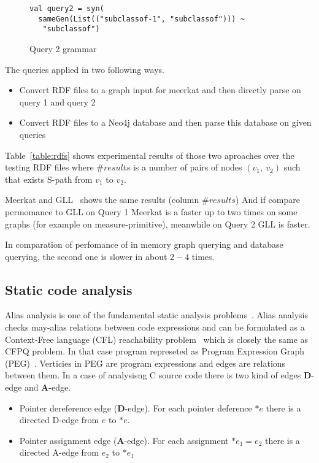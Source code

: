 \begin{figure}[h]
\begin{lstlisting}
val query2 = syn(
  sameGen(List(("subclassof-1", "subclassof"))) ~
   "subclassof")
\end{lstlisting}
\caption{Query 2 grammar}
\label{fig:query2Gen}
\end{figure}

The queries applied in two following ways.
\begin{itemize}
    \item Convert RDF files to a graph input for meerkat and then directly parse on query 1 and query 2
    \item Convert RDF files to a Neo4j database and then parse this database on given queries
\end{itemize} 

Table~\ref{table:rdfs} shows experimental results of those two aproaches over the testing RDF files where $\#results$ is a number of pairs of nodes $(v_1,\ v_2)$ such that exists S-path from $v_1$ to $v_2$.

Meerkat and GLL~\cite{GrigorevR16} shows the same results (column $\#results$)
And if compare permomance to GLL on Query 1 Meerkat is a faster up to two times on some graphs (for example on measure-primitive), meanwhile on Query 2 GLL is faster.

In comparation of perfomance of in memory graph querying and database querying, the second one is slower in about $2-4$ times.


\subsection{Static code analysis}

Alias analysis is one of the fundamental static analysis problems~\cite{Marlowe}.
Alias analysis checks may-alias relations between code expressions and can be formulated as a Context-Free language (CFL) reachability problem~\cite{Reps} which is closely the same as CFPQ problem.
In that case program represeted as Program Expression Graph (PEG)~\cite{Zheng}.
Verticies in PEG are program expressions and edges are relations between them.
In a case of analysisng C source code there is two kind of edges \textbf{D}-edge and \textbf{A}-edge.

\begin{itemize}
    \item Pointer dereference edge (\textbf{D}-edge). For each pointer deference $*e$ there is a directed D-edge from $e$ to $*e$.
    \item Pointer assignment edge (\textbf{A}-edge). For each assignment $*e_1=e_2$ there is a directed A-edge from $e_2$ to $*e_1$
\end{itemize}

